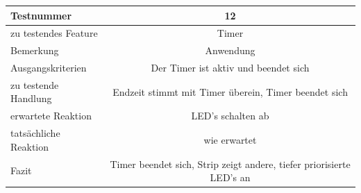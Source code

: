 \documentclass[]{article}
\begin{document}
\begin{longtable}[]{@{}lc@{}}
\toprule
\begin{minipage}[b]{0.25\columnwidth}\raggedright\strut
Testnummer\strut
\end{minipage} & \begin{minipage}[b]{0.55\columnwidth}\centering\strut
12\strut
\end{minipage}\tabularnewline
\midrule
\endhead
\begin{minipage}[t]{0.25\columnwidth}\raggedright\strut
zu testendes Feature\strut
\end{minipage} & \begin{minipage}[t]{0.55\columnwidth}\centering\strut
Timer\strut
\end{minipage}\tabularnewline
\begin{minipage}[t]{0.25\columnwidth}\raggedright\strut
Bemerkung\strut
\end{minipage} & \begin{minipage}[t]{0.55\columnwidth}\centering\strut
Anwendung\strut
\end{minipage}\tabularnewline
\begin{minipage}[t]{0.25\columnwidth}\raggedright\strut
Ausgangskriterien\strut
\end{minipage} & \begin{minipage}[t]{0.55\columnwidth}\centering\strut
Der Timer ist aktiv und beendet sich\strut
\end{minipage}\tabularnewline
\begin{minipage}[t]{0.25\columnwidth}\raggedright\strut
zu testende Handlung\strut
\end{minipage} & \begin{minipage}[t]{0.55\columnwidth}\centering\strut
Endzeit stimmt mit Timer überein, Timer beendet sich\strut
\end{minipage}\tabularnewline
\begin{minipage}[t]{0.25\columnwidth}\raggedright\strut
erwartete Reaktion\strut
\end{minipage} & \begin{minipage}[t]{0.55\columnwidth}\centering\strut
LED's schalten ab\strut
\end{minipage}\tabularnewline
\begin{minipage}[t]{0.25\columnwidth}\raggedright\strut
tatsächliche Reaktion\strut
\end{minipage} & \begin{minipage}[t]{0.55\columnwidth}\centering\strut
wie erwartet\strut
\end{minipage}\tabularnewline
\begin{minipage}[t]{0.25\columnwidth}\raggedright\strut
Fazit\strut
\end{minipage} & \begin{minipage}[t]{0.55\columnwidth}\centering\strut
Timer beendet sich, Strip zeigt andere, tiefer priorisierte LED's
an\strut
\end{minipage}\tabularnewline
\bottomrule
\end{longtable}
\end{document}
